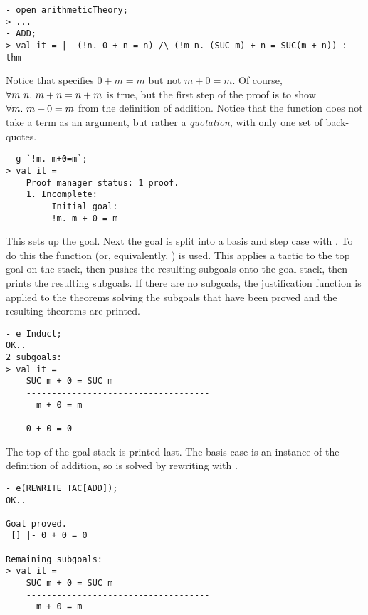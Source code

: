 \begin{session}\begin{verbatim}
- open arithmeticTheory;
> ...
- ADD;
> val it = |- (!n. 0 + n = n) /\ (!m n. (SUC m) + n = SUC(m + n)) : thm
\end{verbatim}\end{session}

\noindent Notice that  specifies
$0+m=m$ but not $m+0=m$. Of course, $\forall m\ n.\ m+n = n+m$ is true,
but the first step of the proof is to show $\forall m.\ m+0=m$ from the
definition of addition.  Notice that the function  does not take
a term as an argument, but rather a \emph{quotation}, with only one
set of back-quotes.

\begin{session}\begin{verbatim}
- g `!m. m+0=m`;
> val it =
    Proof manager status: 1 proof.
    1. Incomplete:
         Initial goal:
         !m. m + 0 = m
\end{verbatim}\end{session}

\noindent This sets up the goal. Next the goal is split into a basis and step case
with . To do this the function  (or,
equivalently, ) is used. This applies a tactic to the top
goal on the stack, then pushes the resulting subgoals onto the goal
stack, then prints the resulting subgoals. If there are no subgoals,
the justification function is applied to the theorems solving the
subgoals that have been proved and the resulting theorems are printed.

\begin{session}\begin{verbatim}
- e Induct;
OK..
2 subgoals:
> val it =
    SUC m + 0 = SUC m
    ------------------------------------
      m + 0 = m

    0 + 0 = 0
\end{verbatim}\end{session}

\noindent The top of the goal stack is printed last. The basis case
is an instance of the definition of addition, so is solved by
rewriting with .

\begin{session}\begin{verbatim}
- e(REWRITE_TAC[ADD]);
OK..

Goal proved.
 [] |- 0 + 0 = 0

Remaining subgoals:
> val it =
    SUC m + 0 = SUC m
    ------------------------------------
      m + 0 = m
\end{verbatim}\end{session}

